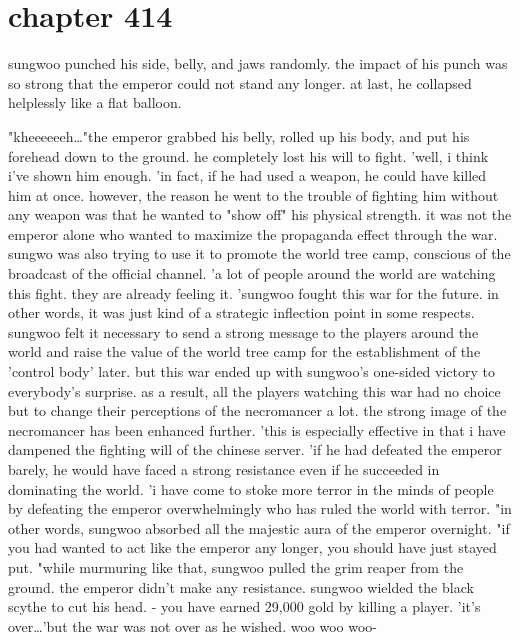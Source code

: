 \section{chapter 414}

sungwoo punched his side, belly, and jaws randomly.
 the impact of his punch was so strong that the emperor could not stand any longer.
 at last, he collapsed helplessly like a flat balloon.





"kheeeeeeh…"the emperor grabbed his belly, rolled up his body, and put his forehead down to the ground.
 he completely lost his will to fight.
 'well, i think i've shown him enough.
'in fact, if he had used a weapon, he could have killed him at once.
 however, the reason he went to the trouble of fighting him without any weapon was that he wanted to "show off" his physical strength.
 it was not the emperor alone who wanted to maximize the propaganda effect through the war.
 sungwo was also trying to use it to promote the world tree camp, conscious of the broadcast of the official channel.
'a lot of people around the world are watching this fight.
 they are already feeling it.
'sungwoo fought this war for the future.
 in other words, it was just kind of a strategic inflection point in some respects.
 sungwoo felt it necessary to send a strong message to the players around the world and raise the value of the world tree camp for the establishment of the 'control body' later.
but this war ended up with sungwoo's one-sided victory to everybody's surprise.
 as a result, all the players watching this war had no choice but to change their perceptions of the necromancer a lot.
 the strong image of the necromancer has been enhanced further.
 'this is especially effective in that i have dampened the fighting will of the chinese server.
'if he had defeated the emperor barely, he would have faced a strong resistance even if he succeeded in dominating the world.
 'i have come to stoke more terror in the minds of people by defeating the emperor overwhelmingly who has ruled the world with terror.
"in other words, sungwoo absorbed all the majestic aura of the emperor overnight.
"if you had wanted to act like the emperor any longer, you should have just stayed put.
"while murmuring like that, sungwoo pulled the grim reaper from the ground.
the emperor didn't make any resistance.
 sungwoo wielded the black scythe to cut his head.
 - you have earned 29,000 gold by killing a player.
'it's over…'but the war was not over as he wished.
 woo woo woo-
